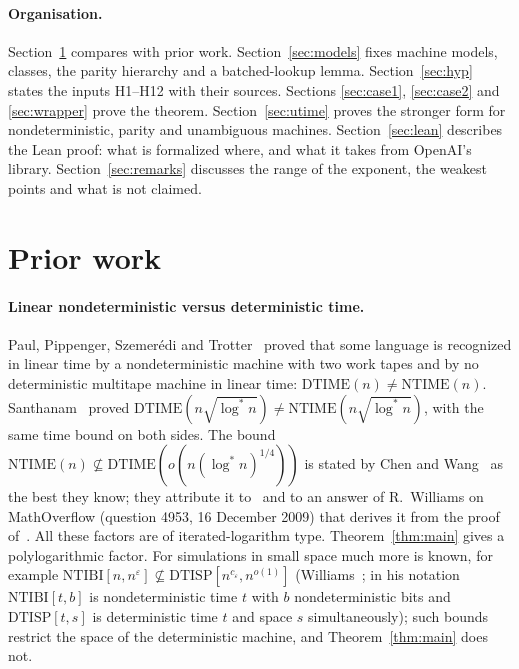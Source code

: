 \documentclass[11pt]{article}
\theoremstyle{definition}
\theoremstyle{remark}
\newcommand{\DTIME}{\mathrm{DTIME}}
\newcommand{\NTIME}{\mathrm{NTIME}}
\begin{document}
\paragraph{Organisation.} Section~\ref{sec:prior} compares with prior work. Section~\ref{sec:models} fixes machine
models, classes, the parity hierarchy and a batched-lookup lemma. Section~\ref{sec:hyp} states the inputs H1--H12 with their sources. Sections
\ref{sec:case1}, \ref{sec:case2} and \ref{sec:wrapper} prove the theorem. Section~\ref{sec:utime} proves the stronger form for
nondeterministic, parity and unambiguous machines. Section~\ref{sec:lean} describes the Lean proof: what is formalized where, and what it takes from OpenAI's library.
Section~\ref{sec:remarks} discusses the range of the exponent, the weakest
points and what is not claimed.

\section{Prior work}\label{sec:prior}

\paragraph{Linear nondeterministic versus deterministic time.} Paul, Pippenger, Szemer\'edi and Trotter~\cite{PPST} proved that
some language is recognized in linear time by a nondeterministic machine with two work tapes and by no deterministic multitape
machine in linear time: $\DTIME(n)\ne\NTIME(n)$. Santhanam~\cite{San} proved $\DTIME(n\sqrt{\log^*n})\ne\NTIME(n\sqrt{\log^*n})$,
with the same time bound on both sides. The bound $\NTIME(n)\not\subseteq\DTIME(o(n(\log^*n)^{1/4}))$ is stated by Chen and
Wang~\cite[footnote 3]{CW} as the best they know; they attribute it to~\cite{PPST} and to an answer of R.~Williams on MathOverflow
(question 4953, 16 December 2009) that derives it from the proof of~\cite{PPST}. All these factors are of iterated-logarithm type. Theorem~\ref{thm:main} gives a polylogarithmic factor. For simulations in small space much more is known, for example $\mathrm{NTIBI}[n,n^{\varepsilon}]\not\subseteq
\mathrm{DTISP}[n^{c_\varepsilon},n^{o(1)}]$ (Williams~\cite[Theorem 1.6]{Wil}; in his notation $\mathrm{NTIBI}[t,b]$ is nondeterministic
time $t$ with $b$ nondeterministic bits and $\mathrm{DTISP}[t,s]$ is deterministic time $t$ and space $s$ simultaneously); such bounds restrict the space of the deterministic
machine, and Theorem~\ref{thm:main} does not.
\end{document}
